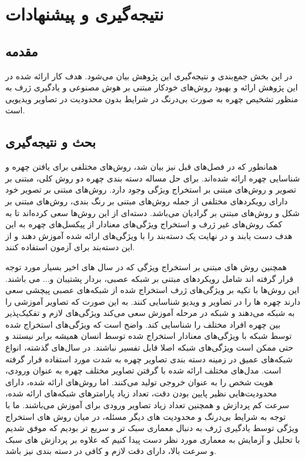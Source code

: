 \chapter{نتیجه‌گیری و پیشنهادات}

\section{مقدمه}
در این بخش جمع‌بندی و نتیجه‌گیری این پژوهش بیان می‌شود. هدف کار ارائه شده در این پژوهش ارائه و بهبود روش‌های خودکار مبتنی بر هوش مصنوعی و یادگیری ژرف به منظور تشخیص چهره به صورت بی‌درنگ در شرایط بدون محدودیت در تصاویر ویدیویی است‌‌‌. 

\section{بحث و نتیجه‌گیری}
همانطور که در فصل‌های قبل نیز بیان شد، روش‌های مختلفی برای یافتن چهره و شناسایی چهره ارائه شده‌اند. برای حل مساله دسته ‌بندی چهره دو روش کلی، مبتنی بر تصویر و روش‌های مبتنی بر استخراج ویژگی وجود دارد. روش‌های مبتنی بر تصویر خود دارای رویکردهای مختلفی از جمله روش‌های مبتنی بر رنگ‌ بندی، روش‌های مبتنی بر شکل و روش‌های مبتنی بر گرادیان می‌باشد. دسته‌ای از این روش‌ها سعی کرده‌اند تا به کمک روش‌های غیر ژرف و استخراج ویژگی‌های معنادار از پیکسل‌های چهره به این هدف دست یابند‌ و در نهایت یک دسته‌بند را با ویژگی‌های ارائه شده آموزش دهند و از این دسته‌بند برای آزمون استفاده کنند. 

\noindent
همچنین روش های مبتنی بر استخراج ویژگی که در سال های اخیر بسیار مورد توجه قرار گرفته اند شامل رویکردهای مبتنی بر شبکه عصبی، بردار پشتیبان و... می باشند. این روش‌ها با تکیه بر ویژگی‌های ژرف استخراج شده از شبکه‌های عصبی پیچشی سعی دارند چهره ‌ها را در تصاویر و ویدیو شناسایی کنند. به این صورت که تصاویر آموزشی را به شبکه می‌دهند و شبکه در مرحله آموزش سعی می‌کند ویژگی‌های لازم و تفکیک‌پذیر بین چهره افراد مختلف ‌‌را شناسایی کند. واضح است که ویژگی‌های استخراج شده توسط شبکه با ویژگی‌های معنادار استخراج شده توسط انسان همیشه برابر نیستند و حتی ممکن است ویژگی‌های شبکه اصلا قابل تفسیر نباشند.
\noindent
در سال‌های گذشته، انواع شبكه‌های عمیق در زمینه دسته بندی تصاویر چهره به شدت مورد استفاده قرار گرفته است. مدل‌های مختلف ارائه شده با گرفتن تصاویر مختلف چهره به عنوان ورودی، هویت شخص را به عنوان خروجی تولید می‌كنند. اما روش‌های ارائه شده، دارای محدودیت‌هایی نظیر پایین بودن دقت، تعداد زیاد پارامترهای شبكه‌های ارائه شده، سرعت کم پردازش و همچنین تعداد زیاد تصاویر ورودی برای آموزش می‌باشند. ما با توجه به شرایط بی‌درنگ و محدودیت های دیگر مسئله، در میان روش های استخراج ویژگی توسط یادگیری ژرف به دنبال معماری سبک تر و سریع تر بودیم که موفق شدیم با تحلیل و آزمایش به معماری مورد نظر دست پیدا کنیم که علاوه بر پردازش های سبک و سرعت بالا، دارای دقت لازم و کافی در دسته بندی نیز باشد.


